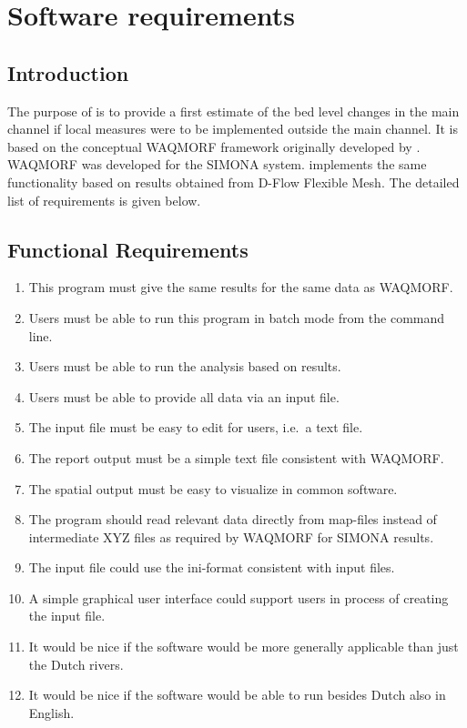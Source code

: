 \chapter{Software requirements}

\section{Introduction}

The purpose of \dfastmi is to provide a first estimate of the bed level changes in the main channel if local measures were to be implemented outside the main channel.
It is based on the conceptual WAQMORF framework originally developed by \citet{Sieben2008}.
WAQMORF was developed for the SIMONA system.
\dfastmi implements the same functionality based on results obtained from D-Flow Flexible Mesh.
The detailed list of requirements is given below.

\section{Functional Requirements} \label{Sec:FuncReq}

\begin{enumerate}
\item This program must give the same results for the same data as WAQMORF.
\item Users must be able to run this program in batch mode from the command line.
\item Users must be able to run the analysis based on \dflowfm results.
\item Users must be able to provide all data via an input file.
\item The input file must be easy to edit for users, i.e.~a text file.
\item The report output must be a simple text file consistent with WAQMORF.
\item The spatial output must be easy to visualize in common software.

\item The program should read relevant data directly from \dflowfm map-files instead of intermediate XYZ files as required by WAQMORF for SIMONA results.

\item The input file could use the ini-format consistent with \dflowfm input files.
\item A simple graphical user interface could support users in process of creating the input file.

\item It would be nice if the software would be more generally applicable than just the Dutch rivers.
\item It would be nice if the software would be able to run besides Dutch also in English.
\end{enumerate}

